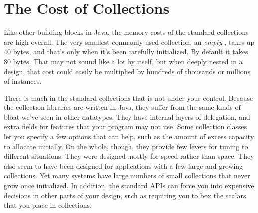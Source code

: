 \begin{description}

\end{description}


\section{The Cost of Collections}
\label{sec:designing-with-collections}

Like other building blocks in Java, the memory costs of the standard collections
are high overall. The very smallest commonly-used collection, an
\emph{empty} , takes up 40 bytes, and that's only when it's been carefully
initialized. By default it takes 80 bytes. That may not sound like a lot by
itself, but when deeply nested in a design, that cost could easily be multiplied
by hundreds of thousands or millions of instances.  

There is much in the standard collections that is not under your control.
Because the collection libraries are written in Java, they suffer
from the same kinds of bloat we've seen in other datatypes. They have
internal layers of delegation, and extra fields for features that your program
may not use. Some
collection classes let you specify a few options that can help, such as
the amount of excess capacity to allocate initially. On the
whole, though, they provide few levers for tuning to different situations. They
were designed mostly for speed rather than space. They also seem to have been
designed for applications with a few large and growing collections. Yet many systems have large numbers
of small collections that never grow once initialized. In addition, the standard APIs can force you into expensive
decisions in other parts of your design, such as requiring you to box the
scalars that you place in collections.


